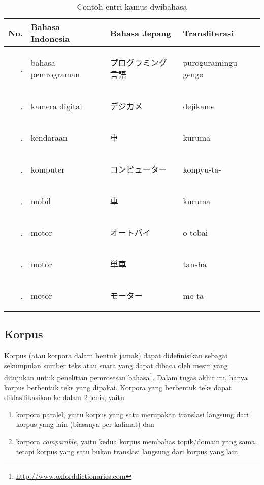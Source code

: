 \documentclass[../main/main.tex]{subfiles}
\begin{document}
\begin{table}[htbp]
	\centering
	\caption{Contoh entri kamus dwibahasa}
	\label{tbl:studi_kamus}
	\begin{tabular}{|r|l|l|l|}
		\hline
		\textbf{No.} & \textbf{Bahasa Indonesia} & \textbf{Bahasa Jepang} & \textbf{Transliterasi}\\ \hline
		\tableitem. & bahasa pemrograman & \begin{CJK}{UTF8}{min}プログラミング言語\end{CJK} & puroguramingu gengo\\ \hline
		\tableitem. & kamera digital & \begin{CJK}{UTF8}{min}デジカメ\end{CJK} & dejikame\\ \hline
		\tableitem. & kendaraan & \begin{CJK}{UTF8}{min}車\end{CJK} & kuruma\\ \hline
		\tableitem. & komputer & \begin{CJK}{UTF8}{min}コンピューター\end{CJK} & konpyu-ta-\\ \hline
		\tableitem. & mobil & \begin{CJK}{UTF8}{min}車\end{CJK} & kuruma\\ \hline
		\tableitem. & motor & \begin{CJK}{UTF8}{min}オートバイ\end{CJK} & o-tobai\\ \hline
		\tableitem. & motor & \begin{CJK}{UTF8}{min}単車\end{CJK} & tansha\\ \hline
		\tableitem. & motor & \begin{CJK}{UTF8}{min}モーター\end{CJK} & mo-ta-\\ \hline
	\end{tabular}
\end{table}

\subsection{Korpus}
Korpus (atau korpora dalam bentuk jamak) dapat didefinisikan sebagai sekumpulan sumber teks atau suara yang dapat dibaca oleh mesin yang ditujukan untuk penelitian pemrosesan bahasa\footnote{\url{http://www.oxforddictionaries.com}}. Dalam tugas akhir ini, hanya korpus berbentuk teks yang dipakai. Korpora yang berbentuk teks dapat diklasifikasikan ke dalam 2 jenis, yaitu \parencite{koehn}
\begin{enumerate}
\item korpora paralel, yaitu korpus yang satu merupakan translasi langsung dari korpus yang lain (biasanya per kalimat) dan
\item korpora \textit{comparable}, yaitu kedua korpus membahas topik/domain yang sama, tetapi korpus yang satu bukan translasi langsung dari korpus yang lain.
\end{enumerate}
\end{document}
